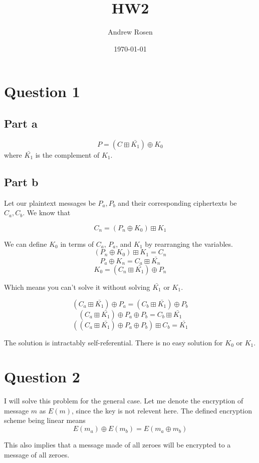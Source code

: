\documentclass[a4paper,10pt]{article}
\title{HW2}
\author{Andrew Rosen}
\date{\today}
\begin{document}
\maketitle
\section{Question 1}

\subsection{Part a}
$$P = (C \boxplus \bar{K_{1}}) \oplus K_{0}$$ where $\bar{K_{1}}$ is the complement of $K_{1}$. 
\subsection{Part b}
Let our plaintext messages be $P_{a}, P_{b} $ and their corresponding ciphertexts be $C_{a}, C_{b}$.  We know that

$$ C_{n} = (P_{n} \oplus K_{0}) \boxplus K_{1} $$

We can define $K_{0}$ in terms of $C_{a}$, $P_{a}$, and $K_{1}$ by rearranging the variables.   
$$ (P_{n} \oplus K_{0}) \boxplus K_{1}  = C_{n} $$
$$  P_{a} \oplus K_{n} = C_{a} \boxplus \bar{K_{n}} $$
$$  K_{0} = (C_{n} \boxplus \bar{K_{1}}) \oplus P_{n} $$

Which means you can't solve it without solving $\bar{K_{1}}$ or ${K_{1}}$.

$$(C_{a} \boxplus \bar{K_{1}}) \oplus P_{a} = (C_{b} \boxplus \bar{K_{1}}) \oplus P_{b} $$
$$(C_{a} \boxplus \bar{K_{1}}) \oplus P_{a} \oplus P_{b} = C_{b} \boxplus \bar{K_{1}}$$
$$\left(\left(C_{a} \boxplus \bar{K_{1}}\right) \oplus P_{a} \oplus P_{b}\right) \boxplus C_{b} =  \bar{K_{1}}$$

The solution is intractably self-referential.  There is no easy solution for $K_{0}$ or $K_{1}$.
\pagebreak

\section{Question 2}

I will solve this problem for the general case.  Let me denote the encryption of message $m$ as $E(m)$, since the key is not relevent here.  The defined encryption scheme being linear means 
$$E(m_{a}) \oplus E(m_{b})  =  E(m_{a} \oplus m_{b})$$

This also implies that a message made of all zeroes will be encrypted to a message of all zeroes.
\end{document}
